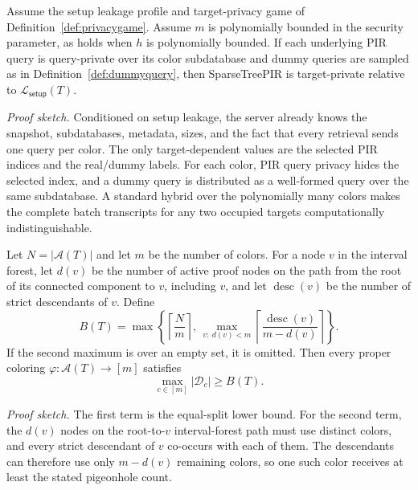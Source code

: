 \begin{theorem}
\label{prop:privacy}
Assume the setup leakage profile and target-privacy game of Definition~\ref{def:privacygame}. Assume $m$ is polynomially bounded in the security parameter, as holds when $h$ is polynomially bounded. If each underlying PIR query is query-private over its color subdatabase and dummy queries are sampled as in Definition~\ref{def:dummyquery}, then SparseTreePIR is target-private relative to $\mathcal{L}_{\mathsf{setup}}(T)$.
\end{theorem}

\noindent\emph{Proof sketch.}
Conditioned on setup leakage, the server already knows the snapshot, subdatabases, metadata, sizes, and the fact that every retrieval sends one query per color. The only target-dependent values are the selected PIR indices and the real/dummy labels. For each color, PIR query privacy hides the selected index, and a dummy query is distributed as a well-formed query over the same subdatabase. A standard hybrid over the polynomially many colors makes the complete batch transcripts for any two occupied targets computationally indistinguishable.

\begin{theorem}
\label{thm:structlb}
Let $N=|\mathcal{A}(T)|$ and let $m$ be the number of colors. For a node $v$ in the interval forest, let $d(v)$ be the number of active proof nodes on the path from the root of its connected component to $v$, including $v$, and let $\operatorname{desc}(v)$ be the number of strict descendants of $v$. Define
\[
B(T)=
\max\left\{
\left\lceil \frac{N}{m}\right\rceil,\,
\max_{v:\ d(v)<m}
\left\lceil \frac{\operatorname{desc}(v)}{m-d(v)}\right\rceil
\right\}.
\]
If the second maximum is over an empty set, it is omitted.
Then every proper coloring $\varphi:\mathcal{A}(T)\rightarrow[m]$ satisfies
\[
\max_{c\in[m]} |\mathcal{D}_c| \ge B(T).
\]
\end{theorem}

\noindent\emph{Proof sketch.}
The first term is the equal-split lower bound. For the second term, the $d(v)$ nodes on the root-to-$v$ interval-forest path must use distinct colors, and every strict descendant of $v$ co-occurs with each of them. The descendants can therefore use only $m-d(v)$ remaining colors, so one such color receives at least the stated pigeonhole count.

